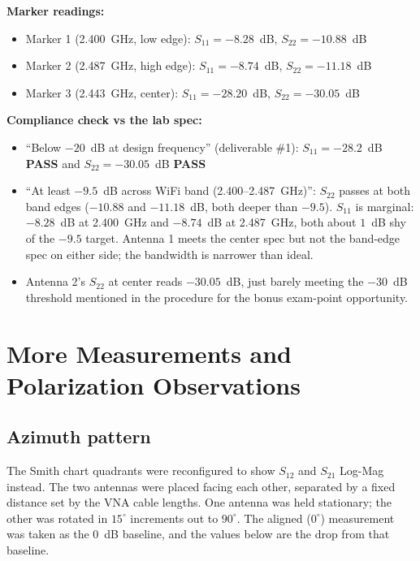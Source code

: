 \documentclass[11pt,letterpaper]{article}
\begin{document}
\textbf{Marker readings:}
\begin{itemize}[leftmargin=*]
  \item Marker 1 (2.400~GHz, low edge): $S_{11} = -8.28$~dB, $S_{22} = -10.88$~dB
  \item Marker 2 (2.487~GHz, high edge): $S_{11} = -8.74$~dB, $S_{22} = -11.18$~dB
  \item Marker 3 (2.443~GHz, center):  $S_{11} = -28.20$~dB, $S_{22} = -30.05$~dB
\end{itemize}

\textbf{Compliance check vs the lab spec:}
\begin{itemize}[leftmargin=*]
  \item ``Below $-20$~dB at design frequency'' (deliverable \#1): $S_{11} = -28.2$~dB \textbf{PASS} and $S_{22} = -30.05$~dB \textbf{PASS}
  \item ``At least $-9.5$~dB across WiFi band (2.400--2.487~GHz)'': $S_{22}$ passes at both band edges ($-10.88$ and $-11.18$~dB, both deeper than $-9.5$). $S_{11}$ is marginal: $-8.28$~dB at 2.400~GHz and $-8.74$~dB at 2.487~GHz, both about $1$~dB shy of the $-9.5$ target. Antenna 1 meets the center spec but not the band-edge spec on either side; the bandwidth is narrower than ideal.
  \item Antenna 2's $S_{22}$ at center reads $-30.05$~dB, just barely meeting the $-30$~dB threshold mentioned in the procedure for the bonus exam-point opportunity.
\end{itemize}

\section{More Measurements and Polarization Observations}

\subsection*{Azimuth pattern}

The Smith chart quadrants were reconfigured to show $S_{12}$ and $S_{21}$ Log-Mag instead. The two antennas were placed facing each other, separated by a fixed distance set by the VNA cable lengths. One antenna was held stationary; the other was rotated in $15^\circ$ increments out to $90^\circ$. The aligned ($0^\circ$) measurement was taken as the 0~dB baseline, and the values below are the drop from that baseline.
\end{document}
